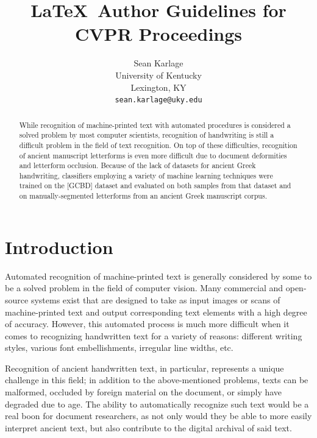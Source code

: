 \documentclass[10pt,twocolumn,letterpaper]{article}
\begin{document}
\title{\LaTeX\ Author Guidelines for CVPR Proceedings}

\author{Sean Karlage\\
University of Kentucky\\
Lexington, KY\\
{\tt\small sean.karlage@uky.edu}
}

\maketitle

\begin{abstract}
    While recognition of machine-printed text with automated procedures is considered a solved problem by most computer scientists, recognition of handwriting is still a difficult problem in the field of text recognition. On top of these difficulties, recognition of ancient manuscript letterforms is even more difficult due to document deformities and letterform occlusion. Because of the lack of datasets for ancient Greek handwriting, classifiers employing a variety of machine learning techniques were trained on the [GCBD] dataset and evaluated on both samples from that dataset and on manually-segmented letterforms from an ancient Greek manuscript corpus.
\end{abstract}

\section{Introduction}

Automated recognition of machine-printed text is generally considered by some to be a solved problem in the field of computer vision. Many commercial and open-source systems exist that are designed to take as input images or scans of machine-printed text and output corresponding text elements with a high degree of accuracy. However, this automated process is much more difficult when it comes to recognizing handwritten text for a variety of reasons: different writing styles, various font embellishments, irregular line widths, etc.

Recognition of ancient handwritten text, in particular, represents a unique challenge in this field; in addition to the above-mentioned problems, texts can be malformed, occluded by foreign material on the document, or simply have degraded due to age. The ability to automatically recognize such text would be a real boon for document researchers, as not only would they be able to more easily interpret ancient text, but also contribute to the digital archival of said text.
\end{document}
